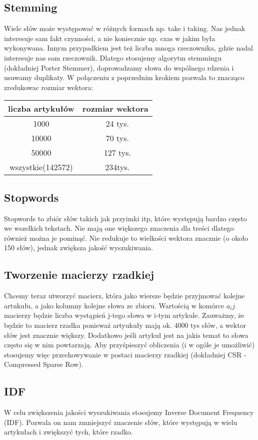 \documentclass{article}
\begin{document}
\subsection{Stemming}
Wiele słów może występować w różnych formach np. take i taking. Nas jednak interesuje sam fakt czynności, a nie koniecznie np. czas w jakim była wykonywana. Innym przypadkiem jest też liczba mnoga rzeczownika, gdzie nadal interesuje nas sam rzeczownik. Dlatego stosujemy algorytm stemmingu (dokładniej Porter Stemmer), doprowadzamy słowa do wspólnego rdzenia i usuwamy duplikaty. 
W połączeniu z poprzednim krokiem pozwala to znacząco zredukowac rozmiar wektora:
\begin{center}
	\begin{tabular}{c|c}
	liczba artykułów & rozmiar wektora \\ \hline
	1000 &  ~24 tys.\\ \hline
	10000 & ~70 tys.\\ \hline
	50000 & ~127 tys. \\ \hline
	wszystkie(142572) & ~234tys.\\
	\end{tabular}
\end{center}
\subsection{Stopwords}
Stopwords to zbiór słów takich jak przyimki itp, które występują bardzo często we wszelkich tekstach. Nie mają one większego znaczenia dla treści dlatego również można je pominąć. Nie redukuje to wielkości wektora znacznie (o około 150 słów), jednak zwiększa jakość wyszukiwania.
\subsection{Tworzenie macierzy rzadkiej}
Chcemy teraz utworzyć macierz, która jako wiersze będzie przyjmować kolejne artukułu, a jako kolumny kolejne słowa ze zbioru. Wartością w komórce $a_ij$ macierzy będzie liczba wystąpień j-tego słowa w i-tym artykule. Zauważmy, że będzie to macierz rzadka ponieważ artyukuły mają ok. 4000 tys słów, a wektor słów jest znacznie większy. Dodatkowo jeśli artykuł jest na jakis temat to słowa często się w nim powtarzają.
Aby przyśpieszyć obliczenia (i w ogóle je umożliwić) stosujemy więc przechowywanie w postaci macierzy rzadkiej (dokładniej CSR - Compressed Sparse Row).
\subsection{IDF}
W celu zwiększenia jakości wyszukiwania stosujemy Inverse Document Frequency (IDF). Pozwala on nam zmniejszyć znaczenie słów, które występują w wielu artykułach i zwiększyć tych, które rzadko.
\end{document}
